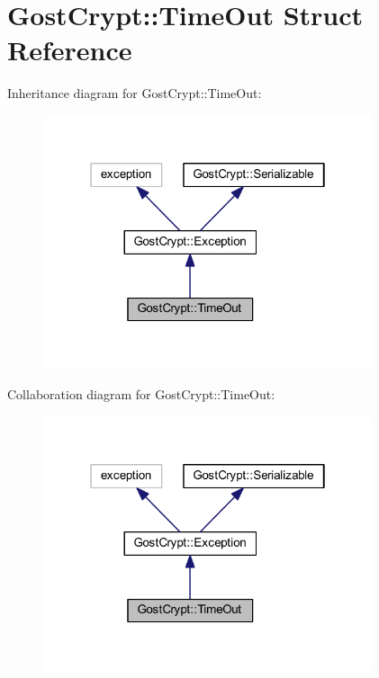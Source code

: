\hypertarget{struct_gost_crypt_1_1_time_out}{}\section{Gost\+Crypt\+:\+:Time\+Out Struct Reference}
\label{struct_gost_crypt_1_1_time_out}


Inheritance diagram for Gost\+Crypt\+:\+:Time\+Out\+:
\nopagebreak
\begin{figure}[H]
\begin{center}
\leavevmode
\includegraphics[width=274pt]{struct_gost_crypt_1_1_time_out__inherit__graph}
\end{center}
\end{figure}


Collaboration diagram for Gost\+Crypt\+:\+:Time\+Out\+:
\nopagebreak
\begin{figure}[H]
\begin{center}
\leavevmode
\includegraphics[width=274pt]{struct_gost_crypt_1_1_time_out__coll__graph}
\end{center}
\end{figure}
